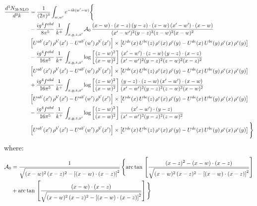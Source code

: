 \documentclass[9pt]{article}
\numberwithin{equation}{section}
\begin{document}
\begin{align}
\frac{d^{3}N_{3b\,\rm NLO}}{d^{3}k} & = \frac{1}{(2\pi)^{3}}\int_{w,w'}e^{-ik(w'-w)}\Bigg\{\notag \\
&-\frac{ig^{4}f^{abd}}{8\pi^{5}}\,\frac{1}{k^{+}}\,\int_{x,y,z,x'}\mathcal{A}_{0}\,
\frac{(x-w)\cdot(x-z)\,(y-z)\cdot(z-w)\,(x'-w')\cdot(x-w)}{(x'-w')^{2}(y-z)^{2}(z-w)^{2}(x-w)^{2}}\notag \\ & \left[U^{ab'}(x')\,\rho^{b'}(x')-U^{ab'}(w')\, \rho^{b'}(x')\right]\times \left[U^{de}(x)\,U^{bc}(z)\, \rho^{e}(x)\,\rho^{c}(y)-U^{de}(x)\,U^{bc}(y)\,\rho^{e}(x)\,\rho^{c}(y)\right] \notag \\
& -\frac{ig^{4}f^{abd}}{16\pi^{5}}\,\frac{1}{k^{+}}\,\int_{x,y,z,x'}\log{\left[\frac{(z-w)^{2}}{(x-w)^{2}}\right]}\,
\frac{(x'-w')\cdot(z-w)\,(y-z)\cdot(x-z)}{(x'-w')^{2}(y-z)^{2}(z-w)^{2}(x-z)^{2}}\notag \\
&\left[U^{ab'}(x')\,\rho^{b'}(x')-U^{ab'}(w')\, \rho^{b'}(x')\right]\times \left[U^{de}(x)\,U^{bc}(z)\, \rho^{e}(x)\,\rho^{c}(y)-U^{de}(x)\,U^{bc}(y)\,\rho^{e}(x)\,\rho^{c}(y)\right] \notag \\
&+ \frac{ig^{4}f^{abd}}{16\pi^{5}}\,\frac{1}{k^{+}}\,\int_{x,y,z,x'}\log{\left[\frac{(z-w)^{2}}{(x-w)^{2}}\right]}\,
\frac{(y-z)\cdot(z-w)\,(x'-w')\cdot(x-w)}{(x'-w')^{2}(y-z)^{2}(z-w)^{2}(x-w)^{2}}\notag \\ 
& \left[U^{ab'}(x')\,\rho^{b'}(x')-U^{ab'}(w')\, \rho^{b'}(x')\right]\times \left[U^{de}(x)\,U^{bc}(z)\, \rho^{e}(x)\,\rho^{c}(y)-U^{de}(x)\,U^{bc}(y)\,\rho^{e}(x)\,\rho^{c}(y)\right]\notag \\ & -\frac{ig^{4}f^{abd}}{16\pi^{5}}\,\frac{1}{k^{+}}\,\int_{x,y,z,x'}\log{\left[\frac{(z-w)^{2}}{(x-w)^{2}}\right]}\,\frac{(x'-w')\cdot(y-z)}{(x'-w')^{2}(y-z)^{2}(z-w)^{2}}\notag \\ & \left[U^{ab'}(x')\,\rho^{b'}(x')-U^{ab'}(w')\, \rho^{b'}(x')\right]\times \left[U^{de}(x)\,U^{bc}(z)\, \rho^{e}(x)\,\rho^{c}(y)-U^{de}(x)\,U^{bc}(y)\,\rho^{e}(x)\,\rho^{c}(y)\right]\Bigg\}
\end{align}
where: \begin{align}
\mathcal{A}_{0} & = \frac{1}{\sqrt{(x-w)^{2}\,(x-z)^{2}-\left[(x-w)\cdot (x-z)\right]^{2}}}\, \Bigg\{\mathrm{arc\,tan}\,\left[\frac{(x-z)^{2}-(x-w)\cdot (x-z)}{\sqrt{(x-w)^{2}\,(x-z)^{2}-\left[(x-w)\cdot (x-z)\right]^{2}}}\right]\notag \\ & + \mathrm{arc\,tan}\,\left[\frac{(x-w)\cdot (x-z)}{\sqrt{(x-w)^{2}\,(x-z)^{2}-\left[(x-w)\cdot (x-z)\right]^{2}}}\right] \Bigg\}
\end{align}
\end{document}
